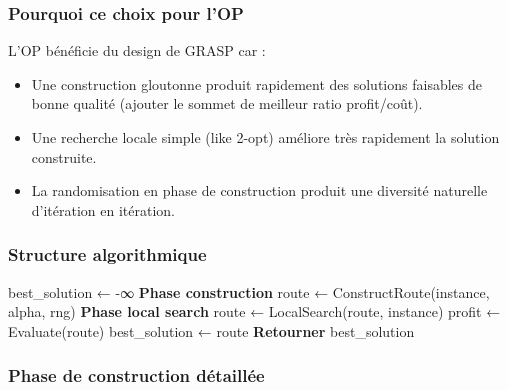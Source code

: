 \documentclass[11pt,a4paper]{article}
\begin{document}
\subsubsection*{Pourquoi ce choix pour l'OP}

L'OP bénéficie du design de GRASP car :

\begin{itemize}
    \item Une construction gloutonne produit rapidement des solutions faisables de bonne qualité (ajouter le sommet de meilleur ratio profit/coût).
    \item Une recherche locale simple (like 2-opt) améliore très rapidement la solution construite.
    \item La randomisation en phase de construction produit une diversité naturelle d'itération en itération.
\end{itemize}

\subsubsection*{Structure algorithmique}

\begin{algorithm}[H]
\caption{GRASP pour l'OP}
\begin{algorithmic}[1]
\State best\_solution ← -∞
    \State \textbf{Phase construction}
    \State route ← ConstructRoute(instance, alpha, rng) 
    \State \textbf{Phase local search}
    \State route ← LocalSearch(route, instance)
    \State profit ← Evaluate(route)
        \State best\_solution ← route
    \EndIf
\EndFor
\State \textbf{Retourner} best\_solution
\end{algorithmic}
\end{algorithm}

\subsubsection*{Phase de construction détaillée}
\end{document}
